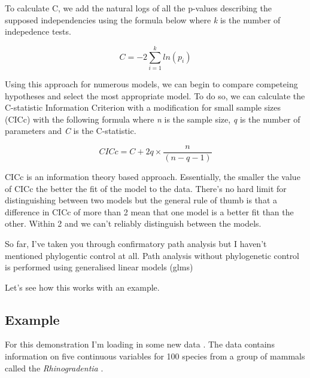 \documentclass[
]{book}
\newenvironment{Shaded}{\begin{snugshade}}{\end{snugshade}}
\newcommand{\KeywordTok}[1]{\textcolor[rgb]{0.13,0.29,0.53}{\textbf{#1}}}
\newcommand{\NormalTok}[1]{#1}
\newcommand{\OperatorTok}[1]{\textcolor[rgb]{0.81,0.36,0.00}{\textbf{#1}}}
\newcommand{\StringTok}[1]{\textcolor[rgb]{0.31,0.60,0.02}{#1}}
\begin{document}
To calculate C, we add the natural logs of all the p-values describing the supposed independencies using the formula below where \emph{k} is the number of indepedence tests.

\[ C = -2 \sum_{i=1}^k ln(p_i) \]

Using this approach for numerous models, we can begin to compare competeing hypotheses and select the most appropriate model. To do so, we can calculate the C-statistic Information Criterion with a modification for small sample sizes (CICc) with the following formula where \emph{n} is the sample size, \emph{q} is the number of parameters and \emph{C} is the C-statistic.

\[ CICc = C + 2q \times \frac{n}{(n - q - 1)}\]

CICc is an information theory based approach. Essentially, the smaller the value of CICc the better the fit of the model to the data. There's no hard limit for distinguishing between two models but the general rule of thumb is that a difference in CICc of more than 2 mean that one model is a better fit than the other. Within 2 and we can't reliably distinguish between the models.

So far, I've taken you through confirmatory path analysis but I haven't mentioned phylogentic control at all. Path analysis without phylogenetic control is performed using generalised linear models (glms)

Let's see how this works with an example.

\hypertarget{example}{%
\subsection{Example}\label{example}}

For this demonstration I'm loading in some new data \citep{Hardenberg13, Gonzalez14}. The data contains information on five continuous variables for 100 species from a group of mammals called the \emph{Rhinogradentia} \citep{snouters}.

\begin{Shaded}
\end{Shaded}
\end{document}
